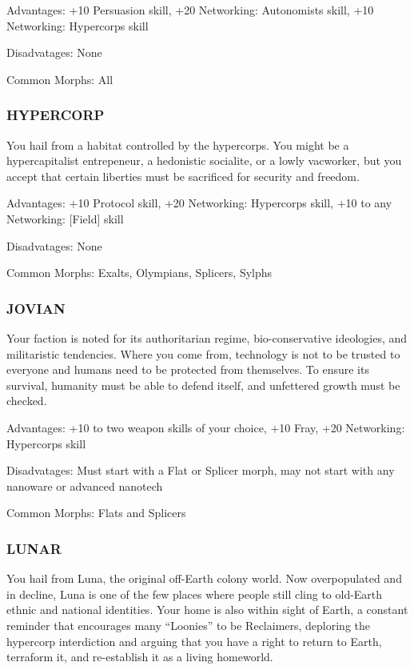 Advantages: +10 Persuasion skill, +20 Networking: Autonomists skill, +10
Networking: Hypercorps skill

Disadvatages: None

Common Morphs: All

\subsubsection{HYPERCORP}
You hail from a habitat controlled by the hypercorps. You might be a
hypercapitalist entrepeneur, a hedonistic socialite, or a lowly vacworker, but
you accept that certain liberties must be sacrificed for security and freedom.

Advantages: +10 Protocol skill, +20 Networking: Hypercorps skill, +10 to any
Networking: [Field] skill

Disadvatages: None

Common Morphs: Exalts, Olympians, Splicers, Sylphs

\subsubsection{JOVIAN}
Your faction is noted for its authoritarian regime, bio-conservative
ideologies, and militaristic tendencies.  Where you come from, technology is
not to be trusted to everyone and humans need to be protected from
themselves. To ensure its survival, humanity must be able to defend itself, and
unfettered growth must be checked.

Advantages: +10 to two weapon skills of your choice, +10 Fray, +20 Networking:
Hypercorps skill

Disadvatages: Must start with a Flat or Splicer morph, may not start with any
nanoware or advanced nanotech

Common Morphs: Flats and Splicers

\subsubsection{LUNAR}
You hail from Luna, the original off-Earth colony world. Now overpopulated and
in decline, Luna is one of the few places where people still cling to old-Earth
ethnic and national identities. Your home is also within sight of Earth, a
constant reminder that encourages many “Loonies” to be Reclaimers, deploring
the hypercorp interdiction and arguing that you have a right to return to
Earth, terraform it, and re-establish it as a living homeworld.

